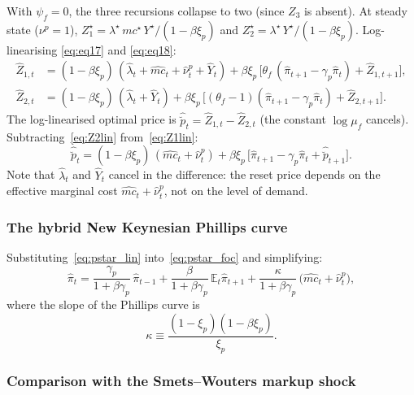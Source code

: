 \documentclass[11pt,a4paper]{article}
\newcommand{\E}{\mathbb{E}}
\renewcommand{\ss}{\star}
\begin{document}
With $\psi_f = 0$, the three recursions collapse to two (since $Z_3$
is absent). At steady state ($\nu^p = 1$),
$Z_1^\ss = \lambda^\ss\,mc^\ss\,Y^\ss/(1-\beta\xi_p)$ and
$Z_2^\ss = \lambda^\ss\,Y^\ss/(1-\beta\xi_p)$. Log-linearising
\eqref{eq:eq17} and \eqref{eq:eq18}:
\begin{align}
  \hat Z_{1,t} &= (1-\beta\xi_p)\,
    (\hat\lambda_t + \widehat{mc}_t + \hat\nu^p_t + \hat Y_t)
  + \beta\xi_p\,
    \bigl[\theta_f\,(\hat\pi_{t+1} - \gamma_p\hat\pi_t)
    + \hat Z_{1,t+1}\bigr],
    \label{eq:Z1lin}\\
  \hat Z_{2,t} &= (1-\beta\xi_p)\,
    (\hat\lambda_t + \hat Y_t)
  + \beta\xi_p\,
    \bigl[(\theta_f-1)(\hat\pi_{t+1} - \gamma_p\hat\pi_t)
    + \hat Z_{2,t+1}\bigr].
    \label{eq:Z2lin}
\end{align}
The log-linearised optimal price is
$\hat{\breve p}_t = \hat Z_{1,t} - \hat Z_{2,t}$ (the constant
$\log\mu_f$ cancels). Subtracting~\eqref{eq:Z2lin}
from~\eqref{eq:Z1lin}:
\begin{equation}\label{eq:pstar_foc}
  \hat{\breve p}_t = (1-\beta\xi_p)\,
    (\widehat{mc}_t + \hat\nu^p_t)
  + \beta\xi_p\,
    \bigl[\hat\pi_{t+1} - \gamma_p\hat\pi_t
    + \hat{\breve p}_{t+1}\bigr].
\end{equation}
Note that $\hat\lambda_t$ and $\hat Y_t$ cancel in the difference:
the reset price depends on the effective marginal
cost $\widehat{mc}_t + \hat\nu^p_t$, not on the level of demand.

\subsubsection{The hybrid New Keynesian Phillips curve}

Substituting~\eqref{eq:pstar_lin} into~\eqref{eq:pstar_foc} and
simplifying:
\begin{equation}\label{eq:nkpc}
  \boxed{
  \hat\pi_t = \frac{\gamma_p}{1+\beta\gamma_p}\,\hat\pi_{t-1}
  + \frac{\beta}{1+\beta\gamma_p}\,\E_t\hat\pi_{t+1}
  + \frac{\kappa}{1+\beta\gamma_p}\,
    \bigl(\widehat{mc}_t + \hat\nu^p_t\bigr),}
\end{equation}
where the slope of the Phillips curve is
\[
  \kappa \equiv \frac{(1-\xi_p)(1-\beta\xi_p)}{\xi_p}.
\]

\subsubsection{Comparison with the Smets--Wouters markup shock}
\label{sec:comparison_sw}
\end{document}

